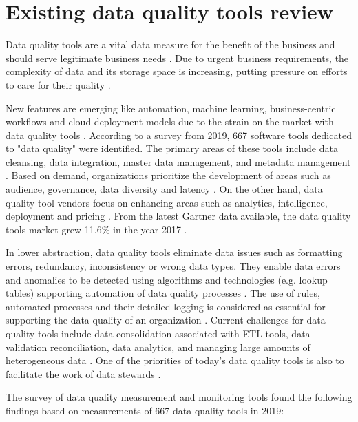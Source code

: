 	\section{Existing data quality tools review}
	\label{sec:existing_data_quality_tools_review}

		Data quality tools are a vital data measure for the benefit of the business and should serve legitimate business needs \cite{McGilvray2008}. Due to urgent business requirements, the complexity of data  and its storage space is increasing, putting pressure on efforts to care for their quality \cite{Chien2019}.

    	New features are emerging like automation, machine learning, business-centric workflows and cloud deployment models due to the strain on the market with data quality tools \cite{Chien2019}. According to a survey \cite{Ehrlinger2019} from 2019, 667 software tools dedicated to "data quality" were identified. The primary areas of these tools include data cleansing, data integration, master data management, and metadata management \cite{Greengard2019}. Based on demand, organizations prioritize the development of areas such as audience, governance, data diversity and latency \cite{Chien2019}. On the other hand, data quality tool vendors focus on enhancing areas such as analytics, intelligence, deployment and pricing \cite{Chien2019}. From the latest Gartner data available, the data quality tools market grew 11.6\% in the year 2017 \cite{Chien2019}.
    	
    	In lower abstraction, data quality tools eliminate data issues such as formatting errors, redundancy, inconsistency or wrong data types. They enable data errors and anomalies to be detected using algorithms and technologies (e.g. lookup tables) supporting automation of data quality processes \cite{Greengard2019}. The use of rules, automated processes and their detailed logging is considered as essential for supporting the data quality of an organization \cite{Greengard2019}. Current challenges for data quality tools include data consolidation associated with ETL tools, data validation reconciliation, data analytics, and managing large amounts of heterogeneous data \cite{Greengard2019}. One of the priorities of today's data quality tools is also to facilitate the work of data stewards \cite{Chien2019}.
    	
		The survey of data quality measurement and monitoring tools found the following findings based on measurements of 667 data quality tools in 2019:
		
